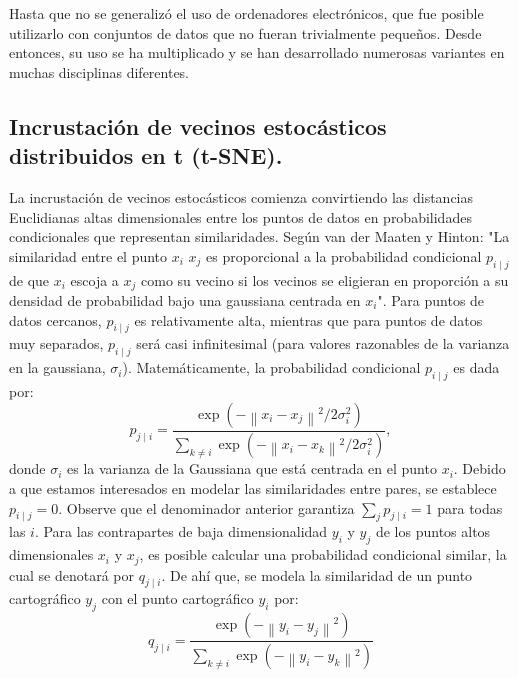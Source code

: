 \documentclass[12pt,letterpaper,oneside,openright]{book}
\begin{document}
	Hasta que no se generalizó el uso de ordenadores electrónicos, que fue posible utilizarlo con conjuntos de datos que no fueran trivialmente pequeños. Desde entonces, su uso se ha multiplicado y se han desarrollado numerosas variantes en muchas disciplinas diferentes.
	

\subsection{Incrustación de vecinos estocásticos distribuidos en t (t-SNE).}
	 La incrustación de vecinos estocásticos comienza convirtiendo las distancias Euclidianas altas dimensionales entre los puntos de datos en probabilidades condicionales que representan similaridades. Según van der Maaten y Hinton: "La similaridad entre el punto $x_i$ $x_j$ es proporcional a la probabilidad condicional $p_{i\mid j}$ de que $x_i$ escoja a $x_j$ como su vecino si los vecinos se eligieran en proporción a su densidad de probabilidad bajo una gaussiana centrada en $x_i$". Para puntos de datos cercanos, $p_{i\mid j}$ es relativamente alta, mientras que para puntos de datos muy separados, $p_{i\mid j}$ será casi infinitesimal (para valores razonables de la varianza en la gaussiana, $\sigma_i$). Matemáticamente, la probabilidad condicional $p_{i\mid j}$ es dada por: 
	 \begin{equation}
	 	\label{eq:prob_cond}
	 	p_{j \mid i}=\frac{\exp \left(-\left\|x_i-x_j\right\|^2 / 2 \sigma_i^2\right)}{\sum_{k \neq i} \exp \left(-\left\|x_i-x_k\right\|^2 / 2 \sigma_i^2\right)},
	 \end{equation}
	donde $\sigma_i$ es la varianza de la Gaussiana que está centrada en el punto $x_i$. Debido a que estamos interesados en modelar las similaridades entre pares, se establece $p_{i\mid j} = 0$. Observe que el denominador anterior garantiza $\sum_j p_{j \mid i}=1$ para todas las $i$. Para las contrapartes de baja dimensionalidad $y_i$ y $y_j$ de los puntos altos dimensionales $x_i$ y $x_j$, es posible calcular una probabilidad condicional similar, la cual se denotará por $q_{j \mid i}$. De ahí que, se modela la similaridad de un punto cartográfico $y_j$ con el punto cartográfico $y_i$ por:
	\begin{equation}
		\label{eq:prob_cond_q}
		q_{j \mid i}=\frac{\exp \left(-\left\|y_i-y_j\right\|^2\right)}{\sum_{k \neq i} \exp \left(-\left\|y_i-y_k\right\|^2\right)}
	\end{equation}
	
\end{document}
